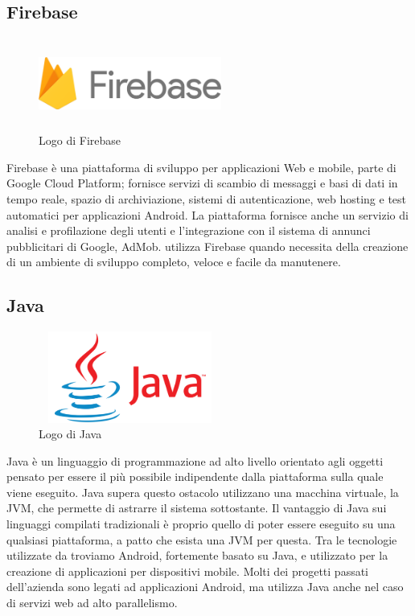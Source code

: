    \subsection{Firebase}
   \begin{figure}[H]
      \begin{center}
         \includegraphics[width=6cm,height=3cm,keepaspectratio]{immagini/firebase-logo}
      \end{center}
      \caption{Logo di Firebase}\label{logofirebase}
   \end{figure}
   Firebase è una piattaforma di sviluppo per applicazioni Web e mobile, parte di Google Cloud Platform; fornisce servizi di scambio di messaggi e basi di dati in tempo reale, spazio di archiviazione, sistemi di autenticazione, web hosting e test automatici per applicazioni Android. La piattaforma fornisce anche un servizio di analisi e profilazione degli utenti e l'integrazione con il sistema di annunci pubblicitari di Google, AdMob.
   \nomeAzienda{} utilizza Firebase quando necessita della creazione di un ambiente di sviluppo completo, veloce e facile da manutenere.

   \subsection{Java}
   \begin{figure}[H]
      \begin{center}
         \includegraphics[width=6cm,height=3cm,keepaspectratio]{immagini/java-logo}      
      \end{center}
      \caption{Logo di Java}\label{logojava}
   \end{figure}
   Java è un linguaggio di programmazione ad alto livello orientato agli oggetti pensato per essere il più possibile indipendente dalla piattaforma sulla quale viene eseguito. Java supera questo ostacolo utilizzano una macchina virtuale, la JVM, che permette di astrarre il sistema sottostante. Il vantaggio di Java sui linguaggi compilati tradizionali è proprio quello di poter essere eseguito su una qualsiasi piattaforma, a patto che esista una JVM per questa. Tra le tecnologie utilizzate da \nomeAzienda{} troviamo Android, fortemente basato su Java, e utilizzato per la creazione di applicazioni per dispositivi mobile. Molti dei progetti passati dell'azienda sono legati ad applicazioni Android, ma \nomeAzienda{} utilizza Java anche nel caso di servizi web ad alto parallelismo.

